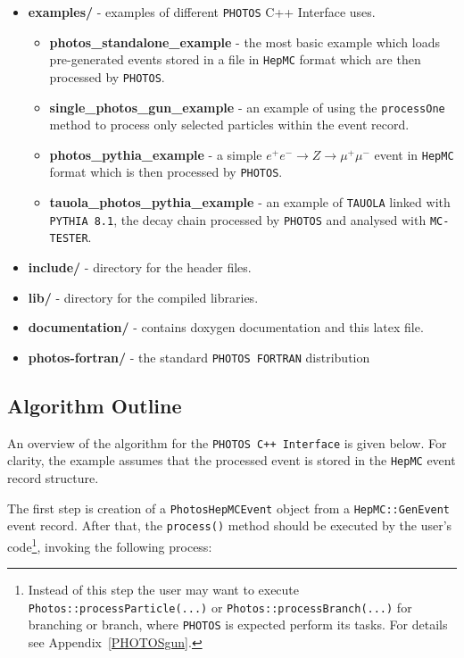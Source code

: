 \documentclass[]{Photos_interface_design}
\begin{document}
\begin{itemize}
  \item {\bf examples/ } - examples of different {\tt PHOTOS} C++ Interface uses.
    \begin{itemize}
	\item {\bf photos\_standalone\_example} - the most basic example which loads pre-generated 
	      events stored in a file in {\tt HepMC} format which are then processed by {\tt PHOTOS}.
	\item {\bf single\_photos\_gun\_example} - an example of using the {\tt processOne} method
	      to process only selected particles within the event record.
    \item {\bf photos\_pythia\_example} - a simple $e^+e^- \rightarrow Z \rightarrow \mu^+\mu^-$ event in
	{\tt HepMC} format which is then processed by {\tt PHOTOS}.
    \item {\bf tauola\_photos\_pythia\_example } - an example of  {\tt TAUOLA} linked with {\tt PYTHIA 8.1},
	the decay chain processed by {\tt PHOTOS} and analysed with  {\tt MC-TESTER}.
    \end{itemize}   
  \item {\bf include/} - directory for the header files.
  \item {\bf lib/ } - directory for the compiled  libraries. 
  \item {\bf documentation/ } - contains doxygen documentation and this latex file.
  \item {\bf photos-fortran/ } - the  standard {\tt PHOTOS FORTRAN} distribution
\end{itemize}

\subsection{Algorithm Outline}
\label{sect:Outline}

An overview of the algorithm for  the {\tt PHOTOS C++ Interface} is
given below. For clarity, the example assumes that the processed event
is stored in the {\tt HepMC} event record structure.

The first step is creation of a {\tt PhotosHepMCEvent} object from
a {\tt HepMC::GenEvent} event record. After that, the {\tt process()} method should
be executed by the user's code\footnote{Instead of  this step
the user may want to execute {\tt Photos::processParticle(...)} or {\tt Photos::processBranch(...)}
for branching or branch, where {\tt PHOTOS} is expected perform its tasks.
For details see Appendix~\ref{PHOTOSgun}.
}, invoking the following process:
\end{document}
